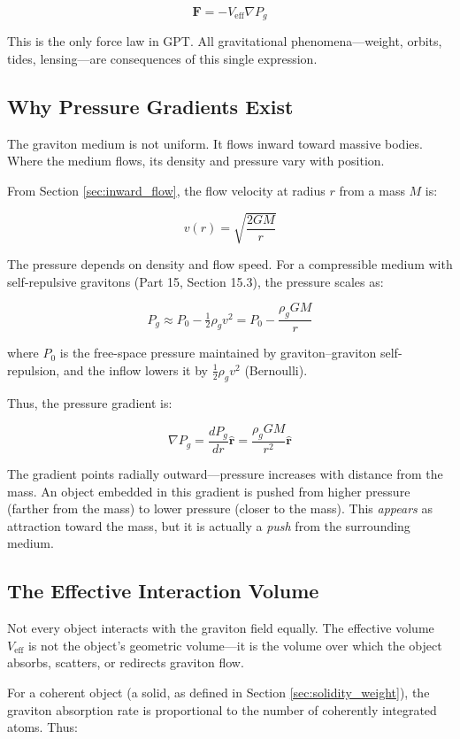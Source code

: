 \documentclass[12pt, a4paper]{article}
\begin{document}
\[
\mathbf{F} = -V_{\text{eff}} \nabla P_g
\]

This is the only force law in GPT. All gravitational phenomena—weight, orbits, tides, lensing—are consequences of this single expression.

\subsection{Why Pressure Gradients Exist}
\label{subsec:why_gradients}

The graviton medium is not uniform. It flows inward toward massive bodies. Where the medium flows, its density and pressure vary with position.

From Section \ref{sec:inward_flow}, the flow velocity at radius \( r \) from a mass \( M \) is:

\[
v(r) = \sqrt{\frac{2GM}{r}}
\]

The pressure depends on density and flow speed. For a compressible medium with self-repulsive gravitons (Part 15, Section 15.3), the pressure scales as:

\[
P_g \approx P_0 - \tfrac{1}{2}\rho_g v^2 = P_0 - \frac{\rho_g GM}{r}
\]

where \( P_0 \) is the free-space pressure maintained by graviton–graviton self-repulsion, and the inflow lowers it by \( \tfrac{1}{2}\rho_g v^2 \) (Bernoulli).

Thus, the pressure gradient is:

\[
\nabla P_g = \frac{dP_g}{dr} \hat{\mathbf{r}} = \frac{\rho_g GM}{r^2} \hat{\mathbf{r}}
\]

The gradient points radially outward—pressure increases with distance from the mass. An object embedded in this gradient is pushed from higher pressure (farther from the mass) to lower pressure (closer to the mass). This \textit{appears} as attraction toward the mass, but it is actually a \textit{push} from the surrounding medium.

\subsection{The Effective Interaction Volume}
\label{subsec:interaction_volume}

Not every object interacts with the graviton field equally. The effective volume \( V_{\text{eff}} \) is not the object's geometric volume—it is the volume over which the object absorbs, scatters, or redirects graviton flow.

For a coherent object (a solid, as defined in Section \ref{sec:solidity_weight}), the graviton absorption rate is proportional to the number of coherently integrated atoms. Thus:
\end{document}
